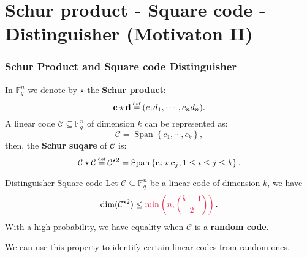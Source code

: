 \documentclass[
10pt, %
%
aspectratio=169, %
]{beamer}
\theoremstyle{plain}%
\theoremstyle{definition}
\theoremstyle{remark}
\newcommand{\calC}{\mathcal{C}}
\newcommand{\calD}{\mathcal{D}}
\newcommand{\fqm}{\mathbb{F}_{q^m}}
\newcommand{\fq}{\mathbb{F}_{q}}
\newcommand{\Span}[1]{\operatorname{Span}\left\lbrace #1\right\rbrace }
\newcommand\myeq{\mathrel{\stackrel{\makebox[0pt]{\mbox{\normalfont\tiny def}}}{=}}}
\begin{document}
	\section{Schur product - Square code - Distinguisher (Motivaton II)}
	\begin{frame}
		\frametitle{Schur Product and Square code Distinguisher}
		In $\fq^n$ we denote by $\star$ the \textbf{Schur product}:
		\[ \mathbf{c} \star \mathbf{d} \myeq (c_1d_1,\cdots,c_nd_n). \]
		A linear code $\calC \subseteq \fq^n$ of dimension $k$ can be represented as:
		\[\calC =\Span{c_1,\cdots,c_k},\]
		then, the \textbf{Schur suqare} of $\calC$ is:
		\[ \mathbf{\calC } \star \mathbf{\calC }\myeq \calC^{\star2} = \Span{\mathbf{c}_i \star \mathbf{c}_j, 1\leq i \leq j \leq k}. \]
		\vspace{-0.7em}
		\vspace{-0.7em}
		\begin{alertblock}{Distinguisher-Square code}
			Let $\calC\subseteq\fq^n$ be a linear code of dimension $k$, we have
			\[\displaystyle \dim (\calC^{\star2})\leq \mathcolor{amaranth}{\mathrm{min}\left(n,\binom{k+1}{2}\right)}.\]
			With a high probability, we have equality when $\calC$ is a \textcolor{amaranth}{\textbf{random code}}.
		\end{alertblock}
		We can use this property to identify certain linear codes from random ones.
		
	\end{frame}
\end{document}
